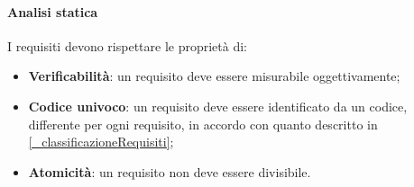 \paragraph{Analisi statica}
I requisiti devono rispettare le proprietà di:
\begin{itemize}
    \item \textbf{Verificabilità}: un requisito deve essere misurabile oggettivamente;
    \item \textbf{Codice univoco}: un requisito deve essere identificato da un codice, differente per ogni requisito, in accordo con quanto descritto in \ref{_classificazioneRequisiti};
    \item \textbf{Atomicità}: un requisito non deve essere divisibile.
\end{itemize}




